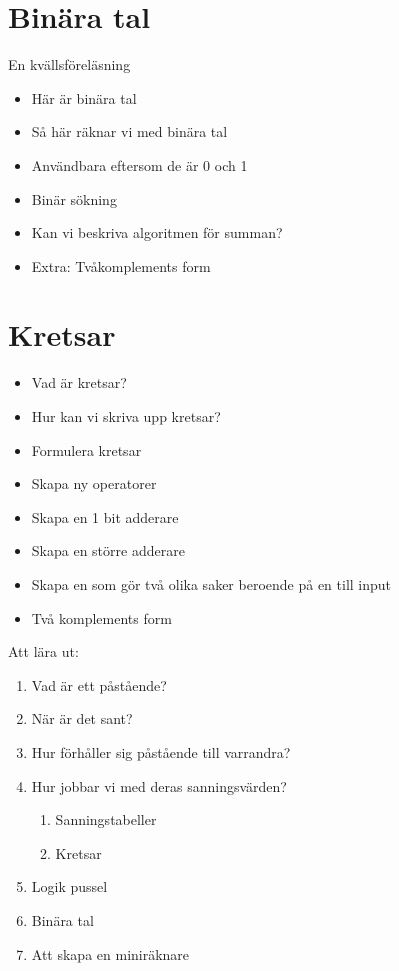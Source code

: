 \section*{Binära tal}
En kvällsföreläsning
\begin{itemize}
	\item Här är binära tal
	\item Så här räknar vi med binära tal
	\item Användbara eftersom de är 0 och 1
	\item Binär sökning
	\item Kan vi beskriva algoritmen för summan?
	\item Extra: Tvåkomplements form
\end{itemize}

\section{Kretsar}
\begin{itemize}
	\item Vad är kretsar?
	\item Hur kan vi skriva upp kretsar?
	\item Formulera kretsar
	\item Skapa ny operatorer
	\item Skapa en 1 bit adderare
	\item Skapa en större adderare
	\item Skapa en som gör två olika saker beroende på en till input
	\item Två komplements form
\end{itemize}














\newpage 
\newpage 

Att lära ut:
\begin{enumerate}
	\item Vad är ett påstående?
	\item När är det sant?
	\item Hur förhåller sig påstående till varrandra?
	\item Hur jobbar vi med deras sanningsvärden?
		\begin{enumerate}
			\item Sanningstabeller
			\item Kretsar
		\end{enumerate}
	\item Logik pussel
	\item Binära tal
	\item Att skapa en miniräknare
\end{enumerate}


